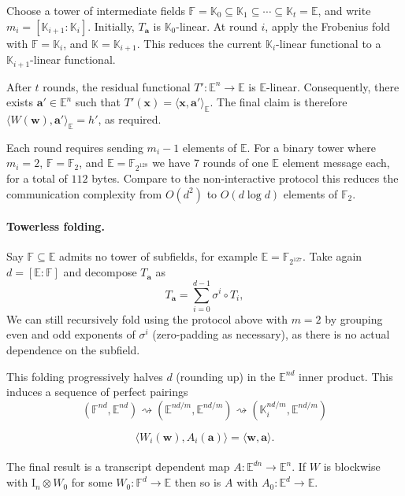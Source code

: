 \begin{construction}
Choose a tower of intermediate fields $\mathbb F=\mathbb K_0 \subseteq\mathbb K_1 \subseteq\cdots \subseteq\mathbb K_t=\mathbb E$, and write $m_i=[\mathbb K_{i+1}:\mathbb K_i]$. Initially, $T_{\mathbf a}$ is $\mathbb K_0$-linear. At round $i$, apply the Frobenius fold with $\mathbb F=\mathbb K_i$, and $\mathbb K=\mathbb K_{i+1}$.  This reduces the current $\mathbb K_i$-linear functional to a $\mathbb K_{i+1}$-linear functional.

After $t$ rounds, the residual functional $T':\mathbb E^n\to\mathbb E$ is $\mathbb E$-linear. Consequently, there exists $\mathbf a'\in\mathbb E^n$ such that $T'(\mathbf x)=\langle\mathbf x,\mathbf a'\rangle_{\mathbb E}$. The final claim is therefore $\langle W(\mathbf w),\mathbf a'\rangle_{\mathbb E}=h'$, as required.
\end{construction}

Each round requires sending $m_i - 1$ elements of $\mathbb{E}$. For a binary tower where $m_i=2$, $\mathbb{F} = \mathbb{F}_2$, and $\mathbb{E} = \mathbb{F}_{2^{128}}$ we have $7$ rounds of one $\mathbb{E}$ element message each, for a total of $112$ bytes. Compare to the non-interactive protocol this reduces the communication complexity from $O(d^2)$ to $O(d \log d)$ elements of $\mathbb{F}_2$.

\paragraph{Towerless folding.}
Say $\mathbb{F} \subseteq \mathbb{E}$ admits no tower of subfields, for example $\mathbb{E} = \mathbb{F}_{2^{127}}$. Take again $d = [\mathbb{E}: \mathbb{F}]$ and decompose $T_\mathbf{a}$ as
\[
T_{\mathbf a} = \sum_{i=0}^{d-1}\sigma^i\circ T_i,
\]
We can still recursively fold using the protocol above with $m=2$ by grouping even and odd exponents of $\sigma^i$ (zero-padding as necessary), as there is no actual dependence on the subfield.

This folding progressively halves $d$ (rounding up) in the $\mathbb{E}^{nd}$ inner product. This induces a sequence of perfect pairings 
\[
(\mathbb F^{nd},\mathbb E^{nd}) \rightsquigarrow (\mathbb E^{nd/m},\mathbb E^{nd/m}) \rightsquigarrow (\mathbb K_i^{nd/m},\mathbb E^{nd/m})
\] 

\[
\langle
W_i(\mathbf w),
A_i(\mathbf a)
\rangle
=
\langle
\mathbf w,
\mathbf a
\rangle.
\]

\paragraph{}
The final result is a transcript dependent map $A: \mathbb{E}^{dn} \to \mathbb{E}^n$. If $W$ is blockwise with $\mathrm{I}_n \otimes W_0$ for some $W_0: \mathbb{F}^d \to \mathbb{E}$ then so is $A$ with $A_0: \mathbb{E}^d \to \mathbb{E}$.



